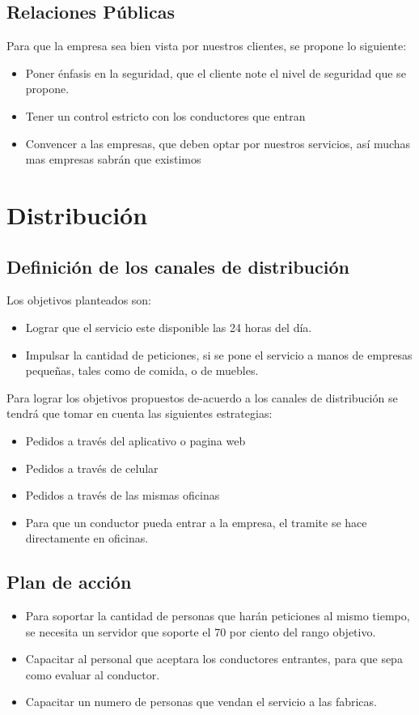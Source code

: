 \subsection{Relaciones Públicas}
Para que la empresa sea bien vista por nuestros clientes, se propone lo siguiente:
\begin{itemize}
\item Poner énfasis en la seguridad, que el cliente note el nivel de seguridad que se propone. 
\item Tener un control estricto con los conductores que entran 
\item Convencer a las empresas, que deben optar por nuestros servicios, así muchas mas empresas sabrán que existimos 
\end{itemize}
\section{Distribución}
\subsection{Definición de los canales de distribución}
Los objetivos planteados son:
\begin{itemize}
\item Lograr que el servicio este disponible las 24 horas del día. 
\item Impulsar la cantidad de peticiones, si se pone el servicio a manos de empresas pequeñas, tales como de comida, o de muebles.
\end{itemize}
Para lograr los objetivos propuestos de-acuerdo a los canales de distribución se tendrá que tomar en cuenta las siguientes estrategias:
\begin{itemize}
\item Pedidos a través del aplicativo o pagina web
\item Pedidos a través de celular 
\item Pedidos a través de las mismas oficinas 
\item Para que un conductor pueda entrar a la empresa, el tramite se hace directamente en oficinas.
\end{itemize}
\subsection{Plan de acción}
\begin{itemize}
\item Para soportar la cantidad de personas que harán peticiones al mismo tiempo, se necesita un servidor que soporte el 70 por ciento del rango objetivo.
\item Capacitar al personal que aceptara los conductores entrantes, para que sepa como evaluar al conductor.
\item Capacitar un numero de personas que vendan el servicio a las fabricas.
\end{itemize}
